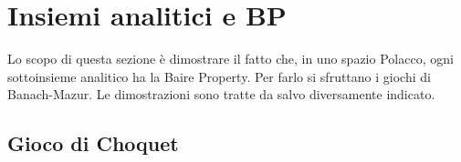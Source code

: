 \documentclass[titlepage]{article}
\newcommand{\1}{\mathds{1}}
\theoremstyle{definition}%
\theoremstyle{plain}
\theoremstyle{remark}
\begin{document}

\section{Insiemi analitici e BP}
\label{sec:orgb092fd1}

Lo scopo di questa sezione è dimostrare il fatto che, in uno spazio Polacco, ogni sottoinsieme analitico ha la Baire Property. Per farlo si sfruttano i giochi di Banach-Mazur. Le dimostrazioni sono tratte da \cite{kechris} salvo diversamente indicato.

\subsection{Gioco di Choquet}
\label{sec:org9c9de7e}
\end{document}
